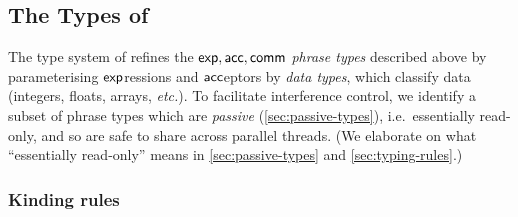 \subsection{The Types of \DPIA}
\label{sec:types}

The type system of \DPIA refines the $\mathsf{exp}, \mathsf{acc}, \mathsf{comm}$ \emph{phrase types} described above by parameterising $\mathsf{exp}$ressions and $\mathsf{acc}$eptors by \emph{data types}, which classify data (integers, floats, arrays, \emph{etc.}).
To facilitate interference control, we identify a subset of phrase types which are \emph{passive} (\autoref{sec:passive-types}), i.e.~essentially read-only, and so are safe to share across parallel threads. (We elaborate on what ``essentially read-only'' means in \autoref{sec:passive-types} and \autoref{sec:typing-rules}.)

\subsubsection{Kinding rules}
\label{sec:kinding-rules}

